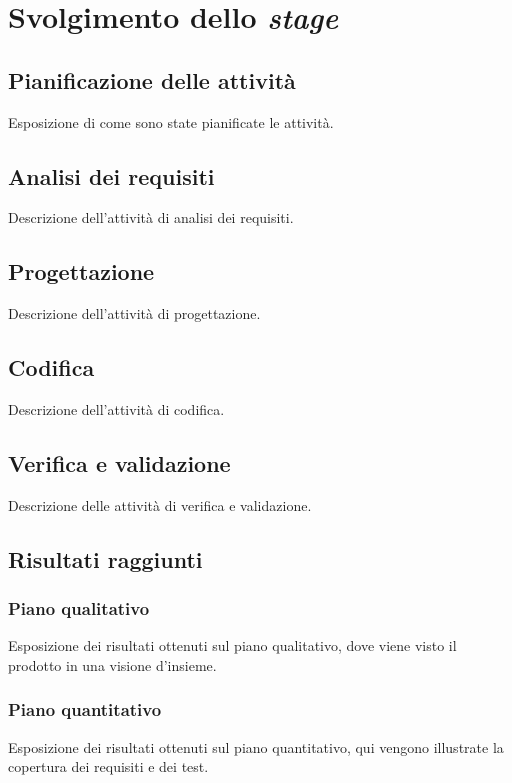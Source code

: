\chapter{Svolgimento dello \textit{stage}}
\label{chap:svolgimento-stage}

\section{Pianificazione delle attività}\noindent
Esposizione di come sono state pianificate le attività.

\section{Analisi dei requisiti}\noindent
Descrizione dell'attività di analisi dei requisiti.

\section{Progettazione}\noindent
Descrizione dell'attività di progettazione.

\section{Codifica}\noindent
Descrizione dell'attività di codifica.

\section{Verifica e validazione}\noindent
Descrizione delle attività di verifica e validazione.

\section{Risultati raggiunti}

\subsection{Piano qualitativo}\noindent
Esposizione dei risultati ottenuti sul piano qualitativo, dove viene visto il prodotto in una visione d'insieme.

\subsection{Piano quantitativo}\noindent
Esposizione dei risultati ottenuti sul piano quantitativo, qui vengono illustrate la copertura dei requisiti e dei test.